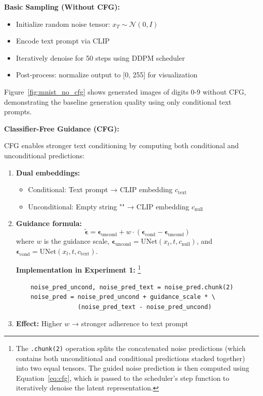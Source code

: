 \textbf{Basic Sampling (Without CFG):}
\begin{itemize}
    \item Initialize random noise tensor: $x_T \sim \mathcal{N}(0, I)$
    \item Encode text prompt via CLIP
    \item Iteratively denoise for 50 steps using DDPM scheduler
    \item Post-process: normalize output to [0, 255] for visualization
\end{itemize}

Figure~\ref{fig:mnist_no_cfg} shows generated images of digits 0-9 without CFG, demonstrating the baseline generation quality using only conditional text prompts.

\textbf{Classifier-Free Guidance (CFG):}

CFG enables stronger text conditioning by computing both conditional and unconditional predictions:

\begin{enumerate}
    \item \textbf{Dual embeddings:}
    \begin{itemize}
        \item Conditional: Text prompt → CLIP embedding $c_\text{text}$
        \item Unconditional: Empty string "" → CLIP embedding $c_\text{null}$
    \end{itemize}
    \item \textbf{Guidance formula:}
    \begin{equation}
        \tilde{\boldsymbol{\epsilon}} = \boldsymbol{\epsilon}_\text{uncond} + w \cdot (\boldsymbol{\epsilon}_\text{cond} - \boldsymbol{\epsilon}_\text{uncond})
        \label{eq:cfg}
    \end{equation}
    where $w$ is the guidance scale, $\boldsymbol{\epsilon}_\text{uncond} = \text{UNet}(x_t, t, c_\text{null})$, and $\boldsymbol{\epsilon}_\text{cond} = \text{UNet}(x_t, t, c_\text{text})$.
    
    \textbf{Implementation in Experiment 1:}
        \footnote{The \texttt{.chunk(2)} operation splits the concatenated noise predictions (which contains both unconditional and conditional predictions stacked together) into two equal tensors. The guided noise prediction is then computed using Equation~\ref{eq:cfg}, which is passed to the scheduler's step function to iteratively denoise the latent representation.}
    \begin{verbatim}
    noise_pred_uncond, noise_pred_text = noise_pred.chunk(2)
    noise_pred = noise_pred_uncond + guidance_scale * \
                 (noise_pred_text - noise_pred_uncond)
    \end{verbatim}
    
    \item \textbf{Effect:} Higher $w$ → stronger adherence to text prompt
\end{enumerate}

